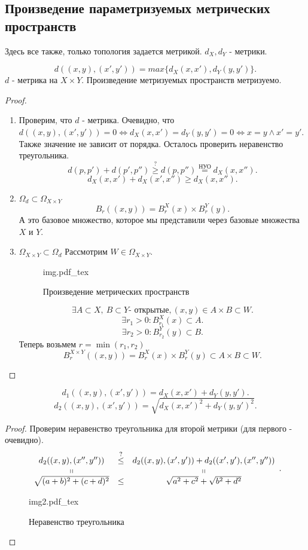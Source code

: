 \documentclass[12pt]{report}
\newcommand{\incfig}[1]{%
    \def\svgwidth{\columnwidth}
    {#1.pdf_tex}
}
\begin{document}
\subsection{Произведение параметризуемых метрических пространств}
Здесь все также, только топология задается метрикой.
$d_X, d_Y$ - метрики.
\begin{thm}
    \[
	d((x, y) , (x', y')) = max \{d_X(x, x'), d_Y(y, y')\}
    .\] 
    $d$ - метрика на $X \times Y$.
   Произведение метризуемых пространств метризуемо. 
\end{thm}
\begin{proof}
    \begin{enumerate}
	\item
    Проверим, что $d$ - метрика.
    Очевидно, что $d((x, y), (x', y')) = 0 \Longleftrightarrow d_X(x, x') = d_Y(y, y') = 0 \Longleftrightarrow x = y \wedge x' = y'$. Также значение не зависит от порядка. Осталось проверить неравенство треугольника.
    \[
	d(p, p') + d(p', p'') \stackrel{?}\ge  d(p, p'') \stackrel{\text{НУО}} = d_X(x, x'')
    .\] 
    \[
	d_X(x, x') + d_X(x', x'') \ge d_X(x, x'')
    .\] 
\item $\Omega_d \subset \Omega _{X \times Y} $
    \[
	B_r((x, y)) = B_r^X(x) \times B_r^Y(y) 
    .\] 
    А  это базовое множество, которое мы представили через базовые множества $X$ и $Y$.

\item $\Omega _{X \times Y} \subset \Omega_d$
    Рассмотрим  $W \in \Omega _{X \times Y}$.
\begin{figure}[ht]
    \centering
    \incfig{img}
    \caption{Произведение метрических пространств}
    \label{fig:img}
\end{figure}
    \[
	\exists A \subset X, ~ B \subset Y \mbox{- открытые}, (x, y) \in  A\times B \subset W 
    .\] 
    \[
	\exists r_1 > 0: B_{r_1}^X(x) \subset A
    .\] 
    \[
	\exists r_2 > 0: B_{r_2}^Y(y) \subset B
    .\] 
    Теперь возьмем $r = \min (r_1, r_2)$
    \[
	B_r^{X \times Y} ((x, y)) = B_r^X(x) \times B_r^Y(y) \subset A \times B \subset W
    .\] 
    \end{enumerate}
\end{proof}
\begin{st}
    \[
	d_1 ((x, y), (x', y')) = d_X(x, x') + d_Y(y, y')
    .\] 
    \[
	d_2((x, y), (x', y')) = \sqrt{d_X(x, x')^2 + d_Y (y, y')^2}
    .\] 
\end{st}
\begin{proof}
    Проверим неравенство треугольника для второй метрики (для первого - очевидно).
    \[
	\begin{array}{ccc}
	    d_2((x, y), (x'', y'')) &\stackrel{?}\le & d_2((x, y), (x', y')) + d_2((x', y'), (x'', y'')) \\
	    \shortparallel & & \shortparallel \\
	    \sqrt{(a + b)^2 + (c+d)^2} & \le & \sqrt {a^2+c^2} + \sqrt {b^2+d^2}
	\end{array}
    .\] 
\begin{figure}[ht]
    \centering
    \incfig{img2}
    \caption{Неравенство треугольника}
    \label{fig:img2}
\end{figure}
\end{proof}
\end{document}
